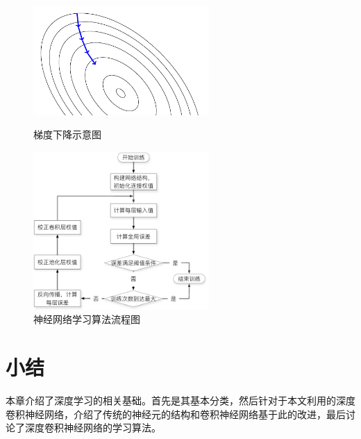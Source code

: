 \begin{figure}[hbt]
	\centering
	\begin{minipage}[b][][b]{7cm}
		\includegraphics[width=6.67cm]{figures/networks/gradient-descent}
    \caption{梯度下降示意图}
    \label{fig:gradient-descent}
	\end{minipage}
	\hspace{10pt}
	\begin{minipage}[b][][b]{7cm}
		\includegraphics[width=6.67cm]{figures/networks/cnn_train}
    \caption{神经网络学习算法流程图}
    \label{fig:cnn_train}

	\end{minipage}

\end{figure}

\section{小结}
\label{sec:network_summary}
本章介绍了深度学习的相关基础。首先是其基本分类，然后针对于本文利用的深度卷积神经网络，介绍了传统的神经元的结构和卷积神经网络基于此的改进，最后讨论了深度卷积神经网络的学习算法。
